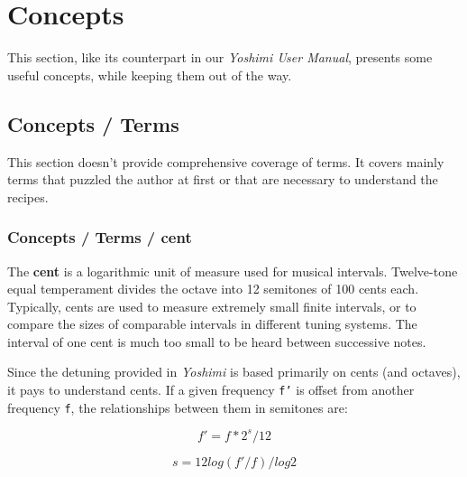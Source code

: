%
%
%

\section{Concepts}
\label{sec:concepts}

   This section, like its counterpart in our \textsl{Yoshimi User Manual},
   presents some useful concepts, while keeping them out of the way.

\subsection{Concepts / Terms}
\label{subsec:concepts_terms}

   This section doesn't provide comprehensive coverage of terms.  It
   covers mainly terms that puzzled the author at first or that are
   necessary to understand the recipes.

\subsubsection{Concepts / Terms / cent}
\label{subsubsec:concepts_terms_cent}

   The \textbf{cent}
   is a logarithmic unit of measure used for musical
   intervals.  Twelve-tone equal temperament divides the octave into 12
   semitones of 100 cents each. Typically, cents are used to measure
   extremely small finite intervals, or to compare the sizes of comparable
   intervals in different tuning systems.
   The interval of one cent is much too small to be heard between
   successive notes.

   Since the detuning provided in \textsl{Yoshimi} is based primarily on
   cents (and octaves), it pays to understand cents.  If a given frequency
   \texttt{f'} is offset from another frequency \texttt{f}, the
   relationships between them in semitones are:

   \[f' = f * 2^s/12\]

   \[s = 12 log (f'/f) / log 2\]

